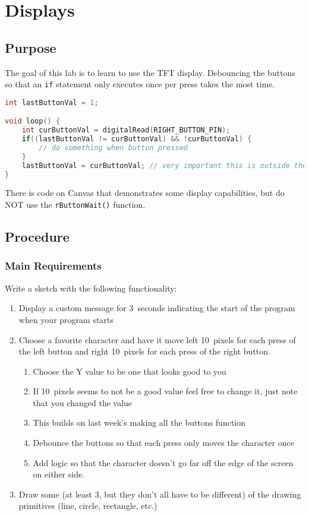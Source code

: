\chapter{Displays}

\section{Purpose}
The goal of this lab is to learn to use the TFT display. Debouncing the buttons 
so that an \lstinline|if| statement only executes once per press takes the most time.

\begin{lstlisting}[language=C++, caption={This is example code for debouncing a button.},label={lst:debounceEx}]
int lastButtonVal = 1;

void loop() {
    int curButtonVal = digitalRead(RIGHT_BUTTON_PIN);
    if((lastButtonVal != curButtonVal) && !curButtonVal) {
        // do something when button pressed
    }
    lastButtonVal = curButtonVal; // very important this is outside the if and inside loop()
}
\end{lstlisting}

There is code on Canvas that demonstrates some display capabilities, but do NOT use the
\lstinline|rButtonWait()| function.

\section{Procedure}
\subsection{Main Requirements}
Write a sketch with the following functionality:
\begin{enumerate}
    \item Display a custom message for 3~seconds indicating the start of the program when
            your program starts 
    \item Choose a favorite character and have it move left 10~pixels for each press
            of the left button and right 10~pixels for each press of the right button.
    \begin{enumerate}
        \item Choose the Y value to be one that looks good to you
        \item If 10~pixels seems to not be a good value feel free to change it, just note
                that you changed the value
        \item This builds on last week's making all the buttons function
        \item Debounce the buttons so that each press only moves the character once
        \item Add logic so that the character doesn't go far off the edge of the screen
                on either side.
    \end{enumerate}
    \item Draw some (at least 3, but they don't all have to be different) of the 
            drawing primitives (line, circle, rectangle, etc.)
\end{enumerate}

